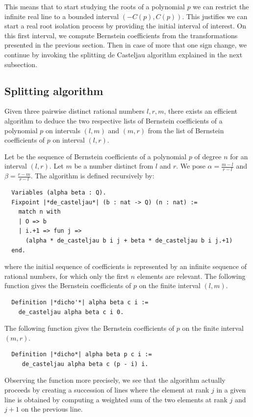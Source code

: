 \documentclass{mscs}
\begin{document}
This means that to start studying the roots of a polynomial $p$ we can
restrict the infinite real line to a bounded interval
$(- C(p), C(p))$. This justifies we can start a real root isolation
process by providing the initial interval of interest. On this first
interval, we compute Bernstein coefficients from the transformations
presented in the previous section. Then in case of more that one sign
change, we continue by invoking the splitting de Casteljau algorithm
explained in the next subsection.

\subsection{Splitting algorithm}\label{ssec:split}

Given three pairwise distinct rational numbers $l, r, m$,
there exists an efficient algorithm to deduce the two respective lists
of Bernstein coefficients of a polynomial $p$ on intervals $(l, m)$
and $(m, r)$ from the list of Bernstein coefficients of $p$ on
interval $(l, r)$.

Let  be the sequence of Bernstein coefficients of a polynomial
$p$ of degree \(n\) for an interval \((l,r)\).
Let $m$ be a number
distinct from $l$ and $r$. We pose
$\alpha = \frac{m - l}{r - l}$ and $\beta = \frac{r - m}{r - l}$. The
 algorithm is defined recursively by:
\begin{lstlisting}
  Variables (alpha beta : Q).
  Fixpoint |*de_casteljau*| (b : nat -> Q) (n : nat) :=
    match n with
    | O => b
    | i.+1 => fun j =>
      (alpha * de_casteljau b i j + beta * de_casteljau b i j.+1)
  end.
\end{lstlisting}
where the initial sequence of coefficients  is represented by an
infinite sequence of rational numbers, for which only the first $n$
elements are relevant.  The following function gives the Bernstein
coefficients of \(p\) on the finite interval \((l,m)\).
\begin{lstlisting}
  Definition |*dicho'*| alpha beta c i :=
    de_casteljau alpha beta c i 0.
\end{lstlisting}
The following function gives the Bernstein coefficients of \(p\) on the
finite interval \((m,r)\).
\begin{lstlisting}
  Definition |*dicho*| alpha beta p c i :=
     de_casteljau alpha beta c (p - i) i.
\end{lstlisting}

Observing the function 
more precisely, we see that the algorithm actually
proceeds by creating a succession of lines where the element at rank
\(j\) in a given line is obtained by computing a weighted sum of the two
elements at rank \(j\) and \(j+1\) on the previous line.
\end{document}
